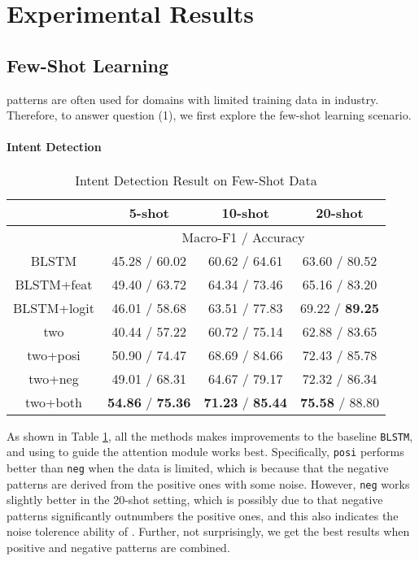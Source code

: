 \section{Experimental Results}
\label{sec:experiments}

\subsection{Few-Shot Learning}
\RE patterns are often used for domains with limited training data in industry. Therefore, to answer question (1), we first explore the few-shot learning scenario.

\paragraph{Intent Detection}

\begin{table}
\setlength{\tabcolsep}{0.23em}
\centering
\small{
\begin{tabular}{|c|c|c|c|}

\hline
  & \multicolumn{1}{|c|}{5-shot} & \multicolumn{1}{|c|}{10-shot} & \multicolumn{1}{|c|}{20-shot}  \\
 \hline
  & \multicolumn{3}{|c|}{Macro-F1 / Accuracy} \\
\hline
BLSTM & 45.28 / 60.02 & 60.62 / 64.61 & 63.60 / 80.52  \\
\hline
BLSTM+feat & 49.40 / 63.72 & 64.34 / 73.46 & 65.16 / 83.20   \\
\hline
BLSTM+logit & 46.01 / 58.68 & 63.51 / 77.83 & 69.22 / \textbf{89.25} \\
\hline
two & 40.44 / 57.22 & 60.72 / 75.14 & 62.88 / 83.65  \\
\hline
two+posi & 50.90 / 74.47 & 68.69 / 84.66 & 72.43 / 85.78  \\
\hline
two+neg & 49.01 / 68.31 & 64.67 / 79.17 & 72.32 / 86.34   \\
\hline
two+both & \textbf{54.86} / \textbf{75.36} & \textbf{71.23} / \textbf{85.44} & \textbf{75.58} / 88.80   \\
\hline

\end{tabular}
}
\caption{Intent Detection Result on Few-Shot Data}
\label{tab_intent_few}
\end{table}

As shown in Table \ref{tab_intent_few}, all the methods makes improvements to the baseline \texttt{BLSTM}, and using \RE to guide the attention module works best. Specifically, \texttt{posi} performs better than \texttt{neg} when the data is limited, which is because that the negative patterns are derived from the positive ones with some noise. However, \texttt{neg} works slightly better in the 20-shot setting, which is possibly due to that negative patterns significantly outnumbers the positive ones, and this also indicates the noise tolerence ability of \NN. Further, not surprisingly, we get the best results when positive and negative patterns are combined.


